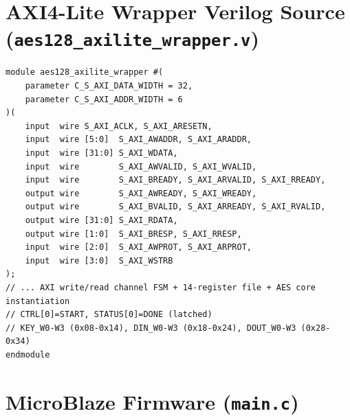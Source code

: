 \renewcommand{\thesection}{B}
\section{AXI4-Lite Wrapper Verilog Source (\texttt{aes128\_axilite\_wrapper.v})}
\label{app:axi_wrapper}

\begin{lstlisting}[style=verilogstyle, caption={aes128\_axilite\_wrapper.v -- AXI4-Lite Slave Wrapper with 14 Registers}]
module aes128_axilite_wrapper #(
    parameter C_S_AXI_DATA_WIDTH = 32,
    parameter C_S_AXI_ADDR_WIDTH = 6
)(
    input  wire S_AXI_ACLK, S_AXI_ARESETN,
    input  wire [5:0]  S_AXI_AWADDR, S_AXI_ARADDR,
    input  wire [31:0] S_AXI_WDATA,
    input  wire        S_AXI_AWVALID, S_AXI_WVALID,
    input  wire        S_AXI_BREADY, S_AXI_ARVALID, S_AXI_RREADY,
    output wire        S_AXI_AWREADY, S_AXI_WREADY,
    output wire        S_AXI_BVALID, S_AXI_ARREADY, S_AXI_RVALID,
    output wire [31:0] S_AXI_RDATA,
    output wire [1:0]  S_AXI_BRESP, S_AXI_RRESP,
    input  wire [2:0]  S_AXI_AWPROT, S_AXI_ARPROT,
    input  wire [3:0]  S_AXI_WSTRB
);
// ... AXI write/read channel FSM + 14-register file + AES core instantiation
// CTRL[0]=START, STATUS[0]=DONE (latched)
// KEY_W0-W3 (0x08-0x14), DIN_W0-W3 (0x18-0x24), DOUT_W0-W3 (0x28-0x34)
endmodule
\end{lstlisting}

\renewcommand{\thesection}{C}
\section{MicroBlaze Firmware (\texttt{main.c})}
\label{app:main_c}

